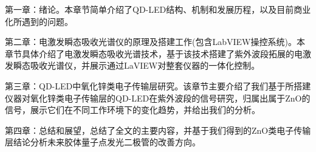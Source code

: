 第一章：绪论。本章节简单介绍了QD-LED结构、机制和发展历程，以及目前商业化所遇到的问题。

第二章：电激发瞬态吸收光谱仪的原理及搭建工作(包含LabVIEW操控系统)。本章节具体介绍了电激发瞬态吸收光谱技术，基于该技术搭建了紫外波段拓展的电激发瞬态吸收光谱仪，并展示通过LaVIEW对整套仪器的一体化控制。
	
第三章：QD-LED中氧化锌类电子传输层研究。该章节主要介绍了我们基于所搭建仪器对氧化锌类电子传输层的QD-LED在紫外波段的信号研究，归属出属于ZnO的信号，展示它们在不同工作环境下的变化趋势，并给出我们的分析。

第四章：总结和展望，总结了全文的主要内容，并基于我们得到的ZnO类电子传输层结论分析未来胶体量子点发光二极管的改善方向。
